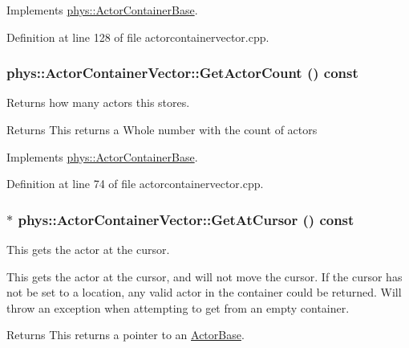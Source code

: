 Implements \hyperlink{classphys_1_1ActorContainerBase_a2e4652bf92f24a0ff20bdc4a7173b567}{phys::ActorContainerBase}.



Definition at line 128 of file actorcontainervector.cpp.

\hypertarget{classphys_1_1ActorContainerVector_a6d2e5e68e23f5798ad10ba41e479d0f7}{
\subsubsection[{GetActorCount}]{ phys::ActorContainerVector::GetActorCount () const}}
\label{d3/d64/classphys_1_1ActorContainerVector_a6d2e5e68e23f5798ad10ba41e479d0f7}


Returns how many actors this stores. 

\begin{DoxyReturn}{Returns}
This returns a Whole number with the count of actors 
\end{DoxyReturn}


Implements \hyperlink{classphys_1_1ActorContainerBase_aa5ec651d4634b2d90efe2a76f9d2fbdd}{phys::ActorContainerBase}.



Definition at line 74 of file actorcontainervector.cpp.

\hypertarget{classphys_1_1ActorContainerVector_a280700490b368a963dd8feae044c7a6d}{
\subsubsection[{GetAtCursor}]{ $\ast$ phys::ActorContainerVector::GetAtCursor () const}}
\label{d3/d64/classphys_1_1ActorContainerVector_a280700490b368a963dd8feae044c7a6d}


This gets the actor at the cursor. 

This gets the actor at the cursor, and will not move the cursor. If the cursor has not be set to a location, any valid actor in the container could be returned. Will throw an exception when attempting to get from an empty container. \begin{DoxyReturn}{Returns}
This returns a pointer to an \hyperlink{classphys_1_1ActorBase}{ActorBase}. 
\end{DoxyReturn}


